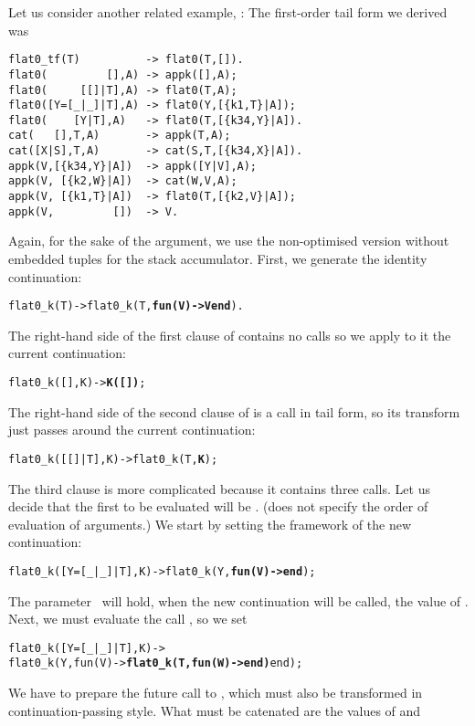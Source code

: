 Let us consider another related example, :
 The first\hyp{}order tail form we derived
was
\begin{verbatim}
flat0_tf(T)          -> flat0(T,[]).
flat0(         [],A) -> appk([],A);
flat0(     [[]|T],A) -> flat0(T,A);
flat0([Y=[_|_]|T],A) -> flat0(Y,[{k1,T}|A]);
flat0(    [Y|T],A)   -> flat0(T,[{k34,Y}|A]).
cat(   [],T,A)       -> appk(T,A);
cat([X|S],T,A)       -> cat(S,T,[{k34,X}|A]).
appk(V,[{k34,Y}|A])  -> appk([Y|V],A);
appk(V, [{k2,W}|A])  -> cat(W,V,A);
appk(V, [{k1,T}|A])  -> flat0(T,[{k2,V}|A]);
appk(V,         [])  -> V.
\end{verbatim}
Again, for the sake of the argument, we use the non\hyp{}optimised
version without embedded tuples for the stack accumulator. First, we
generate the identity continuation:
\begin{alltt}
flat0\_k(T) -> flat0\_k(T,\textbf{fun(V) -> V end}).
\end{alltt}
The right\hyp{}hand side of the first clause of 
contains no calls so we apply to it the current continuation:
\begin{alltt}
flat0\_k(         [],K) -> \textbf{K([])};
\end{alltt}
The right\hyp{}hand side of the second clause of  is a
call in tail form, so its transform just passes around the current
continuation:
\begin{alltt}
flat0\_k(     [[]|T],K) -> flat0\_k(T,\textbf{K});
\end{alltt}
The third clause is more complicated because it contains three
calls. Let us decide that the first to be evaluated will be
. (\Erlang does not specify the order of evaluation
of arguments.) We start by setting the framework of the new
continuation:
\begin{alltt}
flat0\_k([Y=[\_|\_]|T],K) -> flat0\_k(Y,\textbf{fun(V) ->  end});
\end{alltt}
The parameter~ will hold, when the new continuation will be
called, the value of . Next, we must evaluate the
call , so we set
\begin{alltt}
flat0\_k([Y=[\_|\_]|T],K) ->
  flat0\_k(Y,fun(V) -> \textbf{flat0\_k(T,fun(W) ->  end)} end);
\end{alltt}
We have to prepare the future call to , which must also
be transformed in continuation\hyp{}passing style. What must be
catenated are the values of  and
